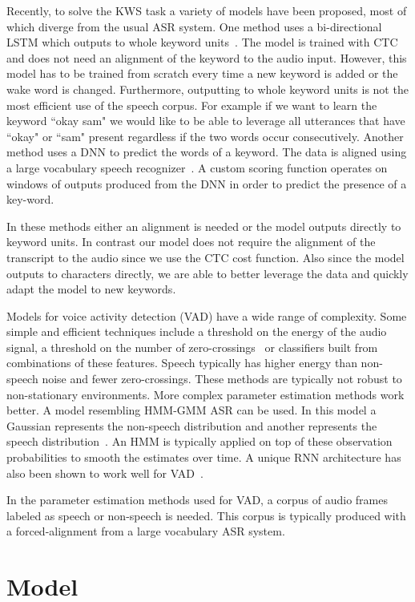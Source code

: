 Recently, to solve the KWS task a variety of models have been proposed, most of
which diverge from the usual ASR system. One method uses a bi-directional LSTM
which outputs to whole keyword units~\cite{fernandez2007}. The model is trained
with CTC and does not need an alignment of the keyword to the audio input.
However, this model has to be trained from scratch every time a new keyword is
added or the wake word is changed. Furthermore, outputting to whole keyword
units is not the most efficient use of the speech corpus. For example if we
want to learn the keyword ``okay sam" we would like to be able to leverage all
utterances that have ``okay" or ``sam" present regardless if the two words
occur consecutively. Another method uses a DNN to predict the words of a
keyword. The data is aligned using a large vocabulary speech
recognizer~\cite{chen2014}. A custom scoring function operates on windows of
outputs produced from the DNN in order to predict the presence of a key-word.  

In these methods either an alignment is needed or the model outputs directly to
keyword units. In contrast our model does not require the alignment of the
transcript to the audio since we use the CTC cost function. Also since the
model outputs to characters directly, we are able to better leverage the data
and quickly adapt the model to new keywords.

Models for voice activity detection (VAD) have a wide range of complexity. Some
simple and efficient techniques include a threshold on the energy of the audio
signal, a threshold on the number of zero-crossings~\cite{junqua1991} or
classifiers built from combinations of these features. Speech typically has
higher energy than non-speech noise and fewer zero-crossings. These methods are
typically not robust to non-stationary environments. More complex parameter
estimation methods work better. A model resembling HMM-GMM ASR can be used. In
this model a Gaussian represents the non-speech distribution and another
represents the speech distribution~\cite{sohn1999}. An HMM is typically applied
on top of these observation probabilities to smooth the estimates over time. A
unique RNN architecture has also been shown to work well for
VAD~\cite{hughes2013}. 

In the parameter estimation methods used for VAD, a corpus of audio frames
labeled as speech or non-speech is needed. This corpus is typically produced
with a forced-alignment from a large vocabulary ASR system. 

\section{Model}
\label{sec:kws:model}

